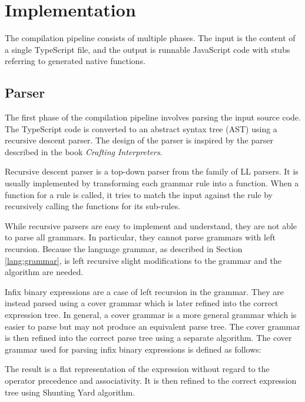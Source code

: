\chapter{Implementation}

The compilation pipeline consists of multiple phases. The input is the content of a single TypeScript file, and the output is runnable JavaScript code with stubs referring to generated native functions.


\section{Parser}

The first phase of the compilation pipeline involves parsing the input source code. The TypeScript code is converted to an abstract syntax tree (AST) using a recursive descent parser. The design of the parser is inspired by the parser described in the book \textit{Crafting Interpreters}\cite{craftinginterpreters}.

Recursive descent parser is a top-down parser from the family of LL parsers. It is usually implemented by transforming each grammar rule into a function. When a function for a rule is called, it tries to match the input against the rule by recursively calling the functions for its sub-rules.

While recursive parsers are easy to implement and understand, they are not able to parse all grammars. In particular, they cannot parse grammars with left recursion. Because the language grammar, as described in Section \ref{lang:grammar}, is left recursive slight modifications to the grammar and the algorithm are needed.

Infix binary expressions are a case of left recursion in the grammar. They are instead parsed using a cover grammar which is later refined into the correct expression tree. In general, a cover grammar is a more general grammar which is easier to parse but may not produce an equivalent parse tree. The cover grammar is then refined into the correct parse tree using a separate algorithm. The cover grammar used for parsing infix binary expressions is defined as follows:

\GrammarRule[BinaryExpression]{}{
    \nonterminal[UnaryExpression]{}{} \gramiter{\nonterminal[InfixBinaryOperator]{}{} \nonterminal[UnaryExpression]{}{}}
}

The result is a flat representation of the expression without regard to the operator precedence and associativity. It is then refined to the correct expression tree using Shunting Yard algorithm\cite{algol60}.

